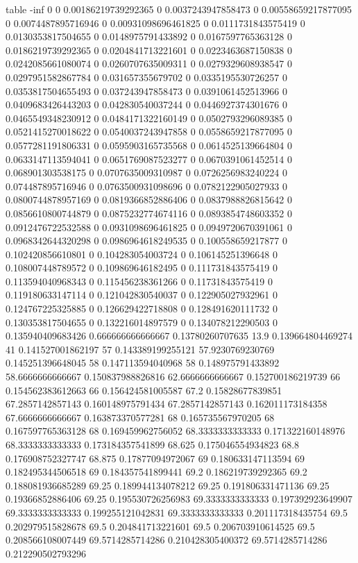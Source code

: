 table {%
-inf 0
0 0.00186219739292365
0 0.0037243947858473
0 0.00558659217877095
0 0.0074487895716946
0 0.00931098696461825
0 0.0111731843575419
0 0.0130353817504655
0 0.0148975791433892
0 0.0167597765363128
0 0.0186219739292365
0 0.0204841713221601
0 0.0223463687150838
0 0.0242085661080074
0 0.0260707635009311
0 0.0279329608938547
0 0.0297951582867784
0 0.031657355679702
0 0.0335195530726257
0 0.0353817504655493
0 0.037243947858473
0 0.0391061452513966
0 0.0409683426443203
0 0.042830540037244
0 0.0446927374301676
0 0.0465549348230912
0 0.0484171322160149
0 0.0502793296089385
0 0.0521415270018622
0 0.0540037243947858
0 0.0558659217877095
0 0.0577281191806331
0 0.0595903165735568
0 0.0614525139664804
0 0.0633147113594041
0 0.0651769087523277
0 0.0670391061452514
0 0.068901303538175
0 0.0707635009310987
0 0.0726256983240224
0 0.074487895716946
0 0.0763500931098696
0 0.0782122905027933
0 0.0800744878957169
0 0.0819366852886406
0 0.0837988826815642
0 0.0856610800744879
0 0.0875232774674116
0 0.0893854748603352
0 0.0912476722532588
0 0.0931098696461825
0 0.0949720670391061
0 0.0968342644320298
0 0.0986964618249535
0 0.100558659217877
0 0.102420856610801
0 0.104283054003724
0 0.106145251396648
0 0.108007448789572
0 0.109869646182495
0 0.111731843575419
0 0.113594040968343
0 0.115456238361266
0 0.11731843575419
0 0.119180633147114
0 0.121042830540037
0 0.122905027932961
0 0.124767225325885
0 0.126629422718808
0 0.128491620111732
0 0.130353817504655
0 0.132216014897579
0 0.134078212290503
0 0.135940409683426
0.666666666666667 0.13780260707635
13.9 0.139664804469274
41 0.141527001862197
57 0.143389199255121
57.9230769230769 0.145251396648045
58 0.147113594040968
58 0.148975791433892
58.6666666666667 0.150837988826816
62.6666666666667 0.152700186219739
66 0.154562383612663
66 0.156424581005587
67.2 0.15828677839851
67.2857142857143 0.160148975791434
67.2857142857143 0.162011173184358
67.6666666666667 0.163873370577281
68 0.165735567970205
68 0.167597765363128
68 0.169459962756052
68.3333333333333 0.171322160148976
68.3333333333333 0.173184357541899
68.625 0.175046554934823
68.8 0.176908752327747
68.875 0.17877094972067
69 0.180633147113594
69 0.182495344506518
69 0.184357541899441
69.2 0.186219739292365
69.2 0.188081936685289
69.25 0.189944134078212
69.25 0.191806331471136
69.25 0.19366852886406
69.25 0.195530726256983
69.3333333333333 0.197392923649907
69.3333333333333 0.199255121042831
69.3333333333333 0.201117318435754
69.5 0.202979515828678
69.5 0.204841713221601
69.5 0.206703910614525
69.5 0.208566108007449
69.5714285714286 0.210428305400372
69.5714285714286 0.212290502793296
}
